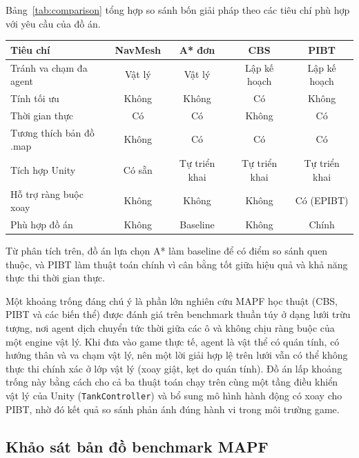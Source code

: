\documentclass[../DoAn.tex]{subfiles}
\begin{document}
Bảng~\ref{tab:comparison} tổng hợp so sánh bốn giải pháp theo các tiêu chí phù hợp
với yêu cầu của đồ án.

\begin{center}
\label{tab:comparison}
\small
\begin{tabular}{|l|c|c|c|c|}
\hline
\textbf{Tiêu chí}           & \textbf{NavMesh} & \textbf{A* đơn} & \textbf{CBS} & \textbf{PIBT} \\ \hline
Tránh va chạm đa agent     & Vật lý           & Vật lý          & Lập kế hoạch & Lập kế hoạch  \\
Tính tối ưu                & Không            & Không           & Có           & Không         \\
Thời gian thực             & Có               & Có              & Không        & Có            \\
Tương thích bản đồ .map    & Không            & Có              & Có           & Có            \\
Tích hợp Unity             & Có sẵn           & Tự triển khai   & Tự triển khai & Tự triển khai \\
Hỗ trợ ràng buộc xoay      & Không            & Không           & Không        & Có (EPIBT)    \\
Phù hợp đồ án              & Không            & Baseline        & Không        & Chính         \\ \hline
\end{tabular}
\end{center}

Từ phân tích trên, đồ án lựa chọn A* làm baseline để có điểm so sánh quen thuộc,
và PIBT làm thuật toán chính vì cân bằng tốt giữa hiệu quả và khả năng thực thi
thời gian thực.

Một khoảng trống đáng chú ý là phần lớn nghiên cứu MAPF học thuật (CBS, PIBT và các biến thể)
được đánh giá trên benchmark thuần túy ở dạng lưới trừu tượng, nơi agent dịch chuyển tức thời
giữa các ô và không chịu ràng buộc của một engine vật lý. Khi đưa vào game thực tế, agent là
vật thể có quán tính, có hướng thân và va chạm vật lý, nên một lời giải hợp lệ trên lưới vẫn
có thể không thực thi chính xác ở lớp vật lý (xoay giật, kẹt do quán tính). Đồ án lấp khoảng trống này bằng
cách cho cả ba thuật toán chạy trên cùng một tầng điều khiển vật lý của Unity
(\texttt{TankController}) và bổ sung mô hình hành động có xoay cho PIBT, nhờ đó kết quả so sánh
phản ánh đúng hành vi trong môi trường game.

\subsection{Khảo sát bản đồ benchmark MAPF}
\end{document}
